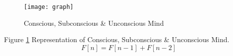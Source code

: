 \begin{figure}[H]
	\texttt{[image: graph]}
	\caption{Conscious, Subconscious \& Unconscious Mind}
	\label{Fig:fig41}
\end{figure}
Figure \ref{Fig:fig41} Representation of Conscious, Subconscious \& Unconscious Mind.
\begin{equation}
	\boxed{F[n] = F[n-1] + F[n-2]}
\end{equation}